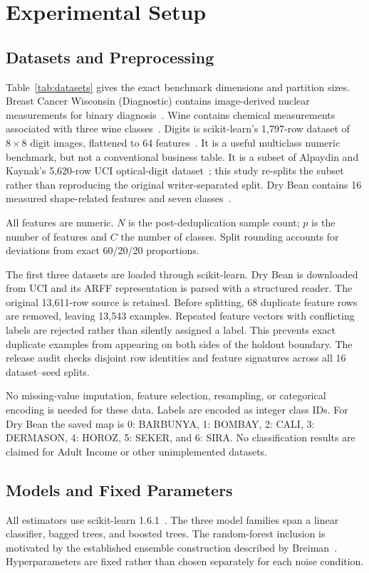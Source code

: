 \chapter{Experimental Setup}
\section{Datasets and Preprocessing}
Table~\ref{tab:datasets} gives the exact benchmark dimensions and partition
sizes. Breast Cancer Wisconsin (Diagnostic) contains image-derived nuclear
measurements for binary diagnosis~\cite{uciCancer}. Wine contains chemical
measurements associated with three wine classes~\cite{uciWine}. Digits is
scikit-learn's 1,797-row dataset of $8\times8$ digit images, flattened to 64
features~\cite{sklearnDigits}. It is a useful multiclass numeric benchmark,
but not a conventional business table. It is a subset of Alpaydin and Kaynak's
5,620-row UCI optical-digit dataset~\cite{uciDigits}; this study re-splits the
subset rather than reproducing the original writer-separated split.
Dry Bean contains 16 measured
shape-related features and seven classes~\cite{uciBean}.

{All features are numeric. $N$ is the post-deduplication sample count; $p$ is
the number of features and $C$ the number of classes. Split rounding accounts
for deviations from exact 60/20/20 proportions.}

The first three datasets are loaded through scikit-learn. Dry Bean is
downloaded from UCI and its ARFF representation is parsed with a structured
reader. The original 13,611-row source is retained. Before splitting, 68
duplicate feature rows are removed, leaving 13,543 examples. Repeated feature
vectors with conflicting labels are rejected rather than silently assigned
a label. This prevents exact duplicate examples from appearing on both sides
of the holdout boundary. The release audit checks disjoint row identities and
feature signatures across all 16 dataset--seed splits.

No missing-value imputation, feature selection, resampling, or categorical
encoding is needed for these data. Labels are encoded as integer class IDs.
For Dry Bean the saved map is 0: BARBUNYA, 1: BOMBAY, 2: CALI, 3: DERMASON,
4: HOROZ, 5: SEKER, and 6: SIRA. No classification results are claimed for
Adult Income or other unimplemented datasets.

\section{Models and Fixed Parameters}
All estimators use scikit-learn 1.6.1~\cite{pedregosa2011}. The three model
families span a linear classifier, bagged trees, and boosted trees. The
random-forest inclusion is motivated by the established ensemble
construction described by Breiman~\cite{breiman2001}. Hyperparameters are
fixed rather than chosen separately for each noise condition.

